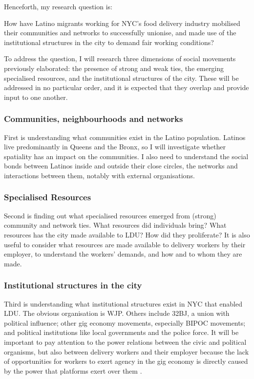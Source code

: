 \documentclass{article}[12pt]
\begin{document}
Henceforth, my research question is:

\begin{center}
How have Latino migrants working for NYC's food delivery industry mobilised their communities and networks to successfully unionise, and made use of the institutional structures in the city to demand fair working conditions?
\end{center}

To address the question, I will research three dimensions of social movements previously elaborated: the presence of strong and weak ties, the emerging specialised resources, and the institutional structures of the city. 
These will be addressed in no particular order, and it is expected that they overlap and provide input to one another.

\subsubsection{Communities, neighbourhoods and networks}

First is understanding what communities exist in the Latino population. Latinos live predominantly in Queens and the Bronx, so I will investigate whether spatiality has an impact on the communities. I also need to understand the social bonds between Latinos inside and outside their close circles, the networks and interactions between them, notably with external organisations.

\subsubsection{Specialised Resources}

Second is finding out what specialised resources emerged from (strong) community and network ties. What resources did individuals bring? What resources has the city made available to LDU? How did they proliferate?
It is also useful to consider what resources are made available to delivery workers by their employer, to understand the workers' demands, and how and to whom they are made.

\subsubsection{Institutional structures in the city}

Third is understanding what institutional structures exist in NYC that enabled LDU. The obvious organisation is WJP. Others include 32BJ, a union with political influence; other gig economy movements, especially BIPOC movements; and political institutions like local governments and the police force. It will be important to pay attention to the power relations between the civic and political organisms, but also between delivery workers and their employer because the lack of opportunities for workers to exert agency in the gig economy is directly caused by the power that platforms exert over them \parencite{anwar2020hidden}.
\end{document}
